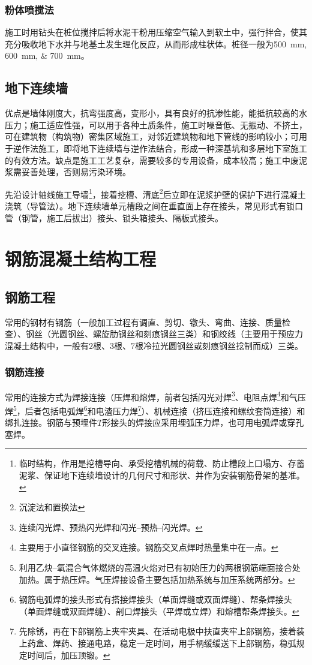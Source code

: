 \documentclass{book}
\begin{document}
\subsection{粉体喷搅法}
\par 施工时用钻头在桩位搅拌后将水泥干粉用压缩空气输入到软土中，强行拌合，使其充分吸收地下水并与地基土发生理化反应，从而形成柱状体。桩径一般为\SIlist{500;600;700}{\mm}。
\section{地下连续墙}
\par 优点是墙体刚度大，抗弯强度高，变形小，具有良好的抗渗性能，能抵抗较高的水压力；施工适应性强，可以用于各种土质条件，施工时噪音低、无振动、不挤土，可在建筑物（构筑物）密集区域施工，对邻近建筑物和地下管线的影响较小；可用于逆作法施工，即将地下连续墙与逆作法结合，形成一种深基坑和多层地下室施工的有效方法。缺点是施工工艺复杂，需要较多的专用设备，成本较高；施工中废泥浆需妥善处理，否则易污染环境。
\par 先沿设计轴线施工导墙\footnote{临时结构，作用是挖槽导向、承受挖槽机械的荷载、防止槽段上口塌方、存蓄泥浆、保证地下连续墙设计的几何尺寸和形状、并作为安装钢筋骨架的基准。}，接着挖槽、清底\footnote{沉淀法和置换法}后立即在泥浆护壁的保护下进行混凝土浇筑（导管法）。地下连续墙单元槽段之间在垂直面上存在接头，常见形式有锁口管（钢管，施工后拔出）接头、锁头箱接头、隔板式接头。
\chapter{钢筋混凝土结构工程}
\section{钢筋工程}
\par 常用的钢材有钢筋（一般加工过程有调直、剪切、镦头、弯曲、连接、质量检查）、钢丝（光圆钢丝、螺旋肋钢丝和刻痕钢丝三类）和钢绞线（主要用于预应力混凝土结构中，一般有$2$根、$3$根、$7$根冷拉光圆钢丝或刻痕钢丝捻制而成）三类。
\subsection{钢筋连接}
\par 常用的连接方式为焊接连接（压焊和熔焊，前者包括闪光对焊\footnote{连续闪光焊、预热闪光焊和闪光--预热--闪光焊。}、电阻点焊\footnote{主要用于小直径钢筋的交叉连接。钢筋交叉点焊时热量集中在一点。}和气压焊\footnote{利用乙炔--氧混合气体燃烧的高温火焰对已有初始压力的两根钢筋端面接合处加热。属于热压焊。气压焊接设备主要包括加热系统与加压系统两部分。}，后者包括电弧焊\footnote{钢筋电弧焊的接头形式有搭接焊接头（单面焊缝或双面焊缝）、帮条焊接头（单面焊缝或双面焊缝）、剖口焊接头（平焊或立焊）和熔槽帮条焊接头。}和电渣压力焊\footnote{先除锈，再在下部钢筋上夹牢夹具、在活动电极中扶直夹牢上部钢筋，接着装上药盒、焊药、接通电路，稳定一定时间，用手柄缓缓送下上部钢筋，稳弧规定时间后，加压顶锻。}）、机械连接（挤压连接和螺纹套筒连接）和绑扎连接。钢筋与预埋件$T$形接头的焊接应采用埋弧压力焊，也可用电弧焊或穿孔塞焊。
\end{document}
